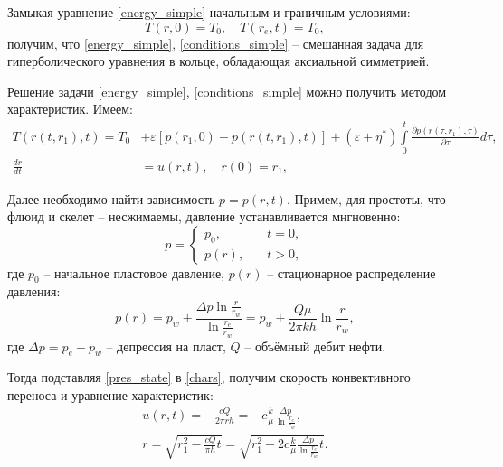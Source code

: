 	Замыкая уравнение \eqref{energy_simple} начальным и граничным условиями:
\begin{equation}
	\label{conditions_simple}
	T(r, 0) = T_0, \quad T(r_e, t) = T_0,
\end{equation}
	получим, что \eqref{energy_simple}, \eqref{conditions_simple} -- смешанная задача для гиперболического уравнения в кольце, обладающая аксиальной симметрией.

	Решение задачи \eqref{energy_simple}, \eqref{conditions_simple} можно получить методом характеристик.
	Имеем:
\begin{align}
	\label{sol_simple}
	T(r(t, r_1), t) = T_0 &+ \varepsilon\left[p(r_1, 0)-p(r(t, r_1), t)\right]+
	(\varepsilon+\eta^{\ast})\int\limits_0^t \frac{\partial p(r(\tau, r_1), \tau)}{\partial \tau}d\tau,\\
	\label{chars}
	\frac{dr}{dt}&=u(r, t), \quad r(0)=r_1,
\end{align}

	Далее необходимо найти зависимость $p = p(r, t)$. Примем, для простоты, что флюид и скелет -- несжимаемы, давление устанавливается мнгновенно:
\begin{equation}
	\label{pres}
	p = 
	\begin{cases}
		p_0, &\quad t=0,\\
		p(r), &\quad t>0,
	\end{cases}
\end{equation}
	где $p_0$ -- начальное пластовое давление, $p(r)$ -- стационарное распределение давления:
\begin{equation}
	\label{pres_state}
	p(r) = p_w + \frac{\Delta p \ln\displaystyle\frac{r}{r_w}}{\ln\displaystyle\frac{r_e}{r_w}}
	 = p_w + \frac{Q\mu}{2\pi k h}\ln\frac{r}{r_w},
\end{equation}
	где $\Delta p = p_e - p_w$ -- депрессия на пласт, $Q$ -- объёмный дебит нефти.

	Тогда подставляя \eqref{pres_state} в \eqref{chars}, получим скорость конвективного переноса и уравнение характеристик:
\begin{align}
	\label{convection_speed}
	u(r, t) = -\frac{cQ}{2\pi r h} = -c\frac{k}{\mu}\frac{\Delta p}{\ln\displaystyle\frac{r_e}{r_w}},\\
	\label{chars_sol}
	r = \sqrt{r_1^2 - \displaystyle\frac{cQ}{\pi h}t} = \sqrt{r_1^2 - 2c\displaystyle\frac{k}{\mu}\frac{\Delta p}{\ln\displaystyle\frac{r_e}{r_w}}t}.
\end{align}

